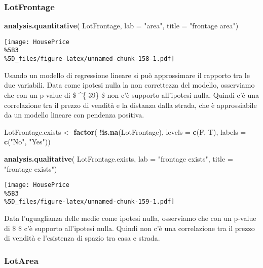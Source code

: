 \documentclass[
]{article}
\newenvironment{Shaded}{\begin{snugshade}}{\end{snugshade}}
\newcommand{\AttributeTok}[1]{\textcolor[rgb]{0.13,0.29,0.53}{#1}}
\newcommand{\FunctionTok}[1]{\textcolor[rgb]{0.13,0.29,0.53}{\textbf{#1}}}
\newcommand{\NormalTok}[1]{#1}
\newcommand{\OtherTok}[1]{\textcolor[rgb]{0.56,0.35,0.01}{#1}}
\newcommand{\SpecialCharTok}[1]{\textcolor[rgb]{0.81,0.36,0.00}{\textbf{#1}}}
\newcommand{\StringTok}[1]{\textcolor[rgb]{0.31,0.60,0.02}{#1}}
\begin{document}
\subsubsection{LotFrontage}\label{lotfrontage-1}

\begin{Shaded}
\begin{Highlighting}[]
\FunctionTok{analysis.quantitative}\NormalTok{(}
\NormalTok{    LotFrontage,}
    \AttributeTok{lab =} \StringTok{"area"}\NormalTok{,}
    \AttributeTok{title =} \StringTok{"frontage area"}\NormalTok{)}
\end{Highlighting}
\end{Shaded}

\texttt{[image: HousePrice\\\%5B3\\\%5D\_files/figure-latex/unnamed-chunk-158-1.pdf]}

Usando un modello di regressione lineare si può approssimare il rapporto
tra le due variabili. Data come ipotesi nulla la non correttezza del
modello, osserviamo che con un p-value di \$ \^{}\{-39\} \$
non c'è supporto all'ipotesi nulla. Quindi c'è una correlazione tra il
prezzo di vendità e la distanza dalla strada, che è approssiabile da un
modello lineare con pendenza positiva.

\begin{Shaded}
\begin{Highlighting}[]
\NormalTok{LotFrontage.exists }\OtherTok{\textless{}{-}} \FunctionTok{factor}\NormalTok{(}
    \SpecialCharTok{!}\FunctionTok{is.na}\NormalTok{(LotFrontage), }
    \AttributeTok{levels =} \FunctionTok{c}\NormalTok{(F, T), }
    \AttributeTok{labels =} \FunctionTok{c}\NormalTok{(}\StringTok{"No"}\NormalTok{, }\StringTok{"Yes"}\NormalTok{))}

\FunctionTok{analysis.qualitative}\NormalTok{(}
\NormalTok{    LotFrontage.exists,}
    \AttributeTok{lab =} \StringTok{"frontage exists"}\NormalTok{,}
    \AttributeTok{title =} \StringTok{"frontage exists"}\NormalTok{)}
\end{Highlighting}
\end{Shaded}

\texttt{[image: HousePrice\\\%5B3\\\%5D\_files/figure-latex/unnamed-chunk-159-1.pdf]}

Data l'uguaglianza delle medie come ipotesi nulla, osserviamo che con un
p-value di \$  \$ c'è supporto all'ipotesi nulla. Quindi non
c'è una correlazione tra il prezzo di vendità e l'esistenza di spazio
tra casa e strada.

\subsubsection{LotArea}\label{lotarea-1}
\end{document}
